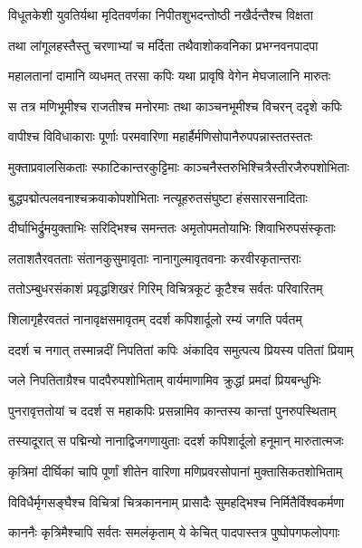 \twolineshloka
{विधूतकेशी युवतिर्यथा मृदितवर्णका}
{निपीतशुभदन्तोष्ठी नखैर्दन्तैश्च विक्षता} %

\twolineshloka
{तथा लांगूलहस्तैस्तु चरणाभ्यां च मर्दिता}
{तथैवाशोकवनिका प्रभग्नवनपादपा} %

\twolineshloka
{महालतानां दामानि व्यधमत् तरसा कपिः}
{यथा प्रावृषि वेगेन मेघजालानि मारुतः} %

\twolineshloka
{स तत्र मणिभूमीश्च राजतीश्च मनोरमाः}
{तथा काञ्चनभूमीश्च विचरन् ददृशे कपिः} %

\twolineshloka
{वापीश्च विविधाकाराः पूर्णाः परमवारिणा}
{महार्हैर्मणिसोपानैरुपपन्नास्ततस्ततः} %

\twolineshloka
{मुक्ताप्रवालसिकताः स्फाटिकान्तरकुट्टिमाः}
{काञ्चनैस्तरुभिश्चित्रैस्तीरजैरुपशोभिताः} %

\twolineshloka
{बुद्धपद्मोत्पलवनाश्चक्रवाकोपशोभिताः}
{नत्यूहरुतसंघुष्टा हंससारसनादिताः} %

\twolineshloka
{दीर्घाभिर्द्रुमयुक्ताभिः सरिद्भिश्च समन्ततः}
{अमृतोपमतोयाभिः शिवाभिरुपसंस्कृताः} %

\twolineshloka
{लताशतैरवतताः संतानकुसुमावृताः}
{नानागुल्मावृतवनाः करवीरकृतान्तराः} %

\twolineshloka
{ततोऽम्बुधरसंकाशं प्रवृद्धशिखरं गिरिम्}
{विचित्रकूटं कूटैश्च सर्वतः परिवारितम्} %

\twolineshloka
{शिलागृहैरवततं नानावृक्षसमावृतम्}
{ददर्श कपिशार्दूलो रम्यं जगति पर्वतम्} %

\twolineshloka
{ददर्श च नगात् तस्मान्नदीं निपतितां कपिः}
{अंकादिव समुत्पत्य प्रियस्य पतितां प्रियाम्} %

\twolineshloka
{जले निपतिताग्रैश्च पादपैरुपशोभिताम्}
{वार्यमाणामिव क्रुद्धां प्रमदां प्रियबन्धुभिः} %

\twolineshloka
{पुनरावृत्ततोयां च ददर्श स महाकपिः}
{प्रसन्नामिव कान्तस्य कान्तां पुनरुपस्थिताम्} %

\twolineshloka
{तस्यादूरात् स पद्मिन्यो नानाद्विजगणायुताः}
{ददर्श कपिशार्दूलो हनूमान् मारुतात्मजः} %

\twolineshloka
{कृत्रिमां दीर्घिकां चापि पूर्णां शीतेन वारिणा}
{मणिप्रवरसोपानां मुक्तासिकतशोभिताम्} %

\twolineshloka
{विविधैर्मृगसङ्घैश्च विचित्रां चित्रकाननाम्}
{प्रासादैः सुमहद्भिश्च निर्मितैर्विश्वकर्मणा} %

\twolineshloka
{काननैः कृत्रिमैश्चापि सर्वतः समलंकृताम्}
{ये केचित् पादपास्तत्र पुष्पोपगफलोपगाः} %

